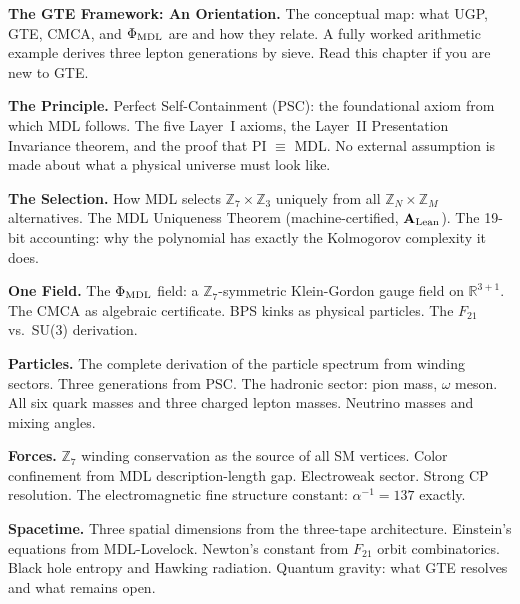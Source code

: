 \documentclass[11pt,openany]{book}
\theoremstyle{remark}
\newcommand{\CatAL}{\ensuremath{\textbf{A}_{\rm Lean}}}
\begin{document}
\begin{description}[leftmargin=1.5cm]
\item[Chapter~\ref{chap:orientation}] \textbf{The GTE Framework: An Orientation.}
  The conceptual map: what UGP, GTE, CMCA, and $\Phi_{\rm MDL}$ are and how they
  relate.
  A fully worked arithmetic example derives three lepton generations by sieve.
  Read this chapter if you are new to GTE.

\item[Chapter~\ref{chap:principle}] \textbf{The Principle.}
  Perfect Self-Containment (PSC): the foundational axiom from which MDL follows.
  The five Layer~I axioms, the Layer~II Presentation Invariance theorem, and the
  proof that PI $\equiv$ MDL.
  No external assumption is made about what a physical universe must look like.

\item[Chapter~\ref{chap:selection}] \textbf{The Selection.}
  How MDL selects $\mathbb{Z}_7\times\mathbb{Z}_3$ uniquely from all
  $\mathbb{Z}_N\times\mathbb{Z}_M$ alternatives.
  The MDL Uniqueness Theorem (machine-certified, \CatAL).
  The 19-bit accounting: why the polynomial has exactly the Kolmogorov complexity it
  does.

\item[Chapter~\ref{chap:field}] \textbf{One Field.}
  The $\Phi_{\rm MDL}$ field: a $\mathbb{Z}_7$-symmetric Klein-Gordon gauge field on
  $\mathbb{R}^{3+1}$.
  The CMCA as algebraic certificate.
  BPS kinks as physical particles.
  The $F_{21}$ vs.\ SU(3) derivation.

\item[Chapter~\ref{chap:particles}] \textbf{Particles.}
  The complete derivation of the particle spectrum from winding sectors.
  Three generations from PSC.
  The hadronic sector: pion mass, $\omega$ meson.
  All six quark masses and three charged lepton masses.
  Neutrino masses and mixing angles.

\item[Chapter~\ref{chap:forces}] \textbf{Forces.}
  $\mathbb{Z}_7$ winding conservation as the source of all SM vertices.
  Color confinement from MDL description-length gap.
  Electroweak sector.
  Strong CP resolution.
  The electromagnetic fine structure constant: $\alpha^{-1} = 137$ exactly.

\item[Chapter~\ref{chap:spacetime}] \textbf{Spacetime.}
  Three spatial dimensions from the three-tape architecture.
  Einstein's equations from MDL-Lovelock.
  Newton's constant from $F_{21}$ orbit combinatorics.
  Black hole entropy and Hawking radiation.
  Quantum gravity: what GTE resolves and what remains open.


\end{description}
\end{document}
